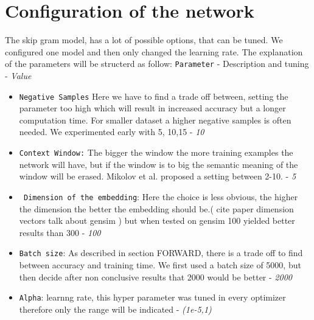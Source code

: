 \section{Configuration of the network}
The skip gram model, has a lot of possible options, that can be tuned. We configured one model and then only changed the learning rate. The explanation of the parameters will be structerd as follow: 
\texttt{Parameter} - Description and tuning -  \textit{Value}
\begin{itemize}
\item \texttt{Negative Samples} Here we have to find a trade off between, setting the parameter too high which will result in increased accuracy but a longer computation time. For smaller dataset a higher negative samples is often needed. We experimented early with 5, 10,15 - \textit{10}
\item \texttt{Context Window:} The bigger the window the more training examples the network will have, but if the window is to big the semantic meaning of the window will be erased. Mikolov et al. proposed a setting between 2-10. - \textit{5}
\item\texttt{ Dimension of the embedding}: Here the choice is less obvious, the higher the dimension the better the embedding should be.( cite paper dimension vectors talk about gensim ) but when tested on gensim 100 yielded better results than 300 - \textit{100}
\item \texttt{Batch size}: As described in section FORWARD, there is a trade off to find between accuracy and training time. We first used a batch size of 5000, but then decide after non conclusive results  that 2000 would be better - \textit{2000}
\item \texttt{Alpha}: learnng rate, this hyper parameter was tuned in every optimizer therefore only the range will be indicated - \textit{(1e-5,1)}
\end{itemize}

